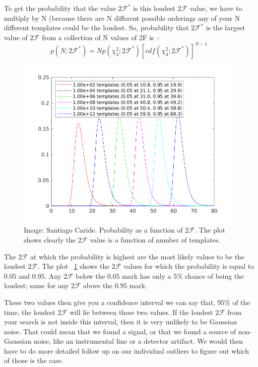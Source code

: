 \documentclass{ttuthes2007}
\begin{document}
To get the probability that the value $2\mathcal{F}^*$  is this loudest
$2\mathcal{F}$ value, we have to multiply by N (because there are N different
possible orderings any of your N different templates could be the loudest. So,
probability that $2\mathcal{F}^*$ is the largest value of $2\mathcal{F}$ from a
collection of N values of 2F is~\cite{Abadie_2010, Wette:2009uea}:
\begin{equation}                                                                
p(N;2\mathcal{F}^*)=
Np(\chi^2_4;2\mathcal{F}^*)[cdf(\chi^2_4;2\mathcal{F}^*)]^{N-1} 
\end{equation}

\begin{figure}[bht!]                                                            
        \includegraphics[width=\textwidth]{figure/2F_max.png}                  
        \caption{Image: Santiago Caride. Probability as a function of
                 $2\mathcal{F}$. The
                 plot shows clearly the $2\mathcal{F}$ value is a function of number of  templates.}                             
        \label{fig:2F_max}                                                  
\end{figure} 
The  $2\mathcal{F}$ at which the probability is highest are the most likely
values to be the loudest $2\mathcal{F}$. The plot ~\ref{fig:2F_max} shows the
$2\mathcal{F}$ values for which the probability is equal to $0.05$ and $0.95$.
Any $2\mathcal{F}$ below the $0.05$ mark has only a $5\%$ chance of being the
loudest; same for any $2\mathcal{F}$ above the $0.95$ mark.

These two values then give you a confidence interval we can say that, $95\%$ of
the time, the loudest  $2\mathcal{F}$ will lie between these two values. If the
loudest  $2\mathcal{F}$ from your search is not inside this interval, then it is
very unlikely to be Gaussian noise. That could mean that we found a signal, or
that we found a source of non-Gaussian noise, like an instrumental line or a
detector artifact. We would then have to do more detailed follow up on our
individual outliers to figure out which of those is the case.
\end{document}
